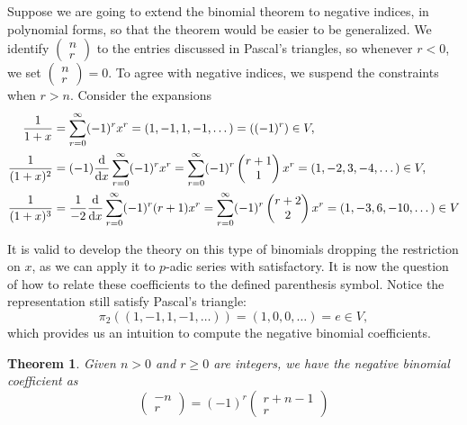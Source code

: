 \documentclass[12pt]{article}
\newtheorem*{theorem}{Theorem}
\begin{document}
    Suppose we are going to extend the binomial theorem to negative indices, in polynomial forms, so that the theorem would be easier to be generalized. We identify $\begin{pmatrix}
        n\\r
    \end{pmatrix}$ to the entries discussed in Pascal's triangles, so whenever $r<0$, we set $\begin{pmatrix}
        n\\r
    \end{pmatrix}=0$. To agree with negative indices, we suspend the constraints when $r>n$. Consider the expansions \begin{align*}
        \frac{1}{1+x}&=\sum_{r=0}^{\infty}(-1)^r x^r=(1,-1,1,-1,\dots)=((-1)^r)\in V,\\
        \frac{1}{(1+x)^2}&=(-1)\derivative{x}\sum_{r=0}^{\infty}(-1)^r x^r=\sum_{r=0}^{\infty}(-1)^{r} \begin{pmatrix}
            r+1\\1
        \end{pmatrix}x^r=(1,-2,3,-4,\dots)\in V,\\
        \frac{1}{(1+x)^3}&=\frac{1}{-2}\derivative{x}\sum_{r=0}^{\infty}(-1)^{r} (r+1)x^r=\sum_{r=0}^{\infty}(-1)^{r} \begin{pmatrix}
            r+2\\2
        \end{pmatrix}x^r=(1,-3,6,-10,\dots)\in V
    \end{align*}

    It is valid to develop the theory on this type of binomials dropping the restriction on $x$, as we can apply it to $p$-adic series with satisfactory. It is now the question of how to relate these coefficients to the defined parenthesis symbol. Notice the representation still satisfy Pascal's triangle: \[\pi_2((1,-1,1,-1,\dots))=(1,0,0,\dots)=e\in V,\] which provides us an intuition to compute the negative binomial coefficients.

    \begin{theorem}
        Given $n>0$ and $r\geq 0$ are integers, we have the negative binomial coefficient as \[\begin{pmatrix}
            -n\\r
        \end{pmatrix}=(-1)^r\begin{pmatrix}
            r+n-1\\r
        \end{pmatrix}\]
    \end{theorem}
\end{document}
